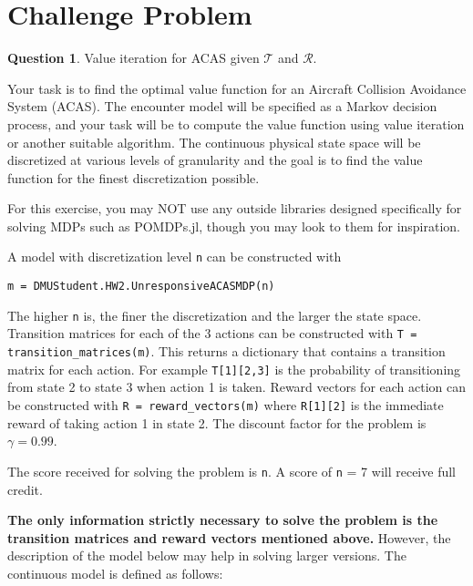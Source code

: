 \documentclass{article}
\theoremstyle{definition}
\newtheorem{question}[thm]{Question}
\begin{document}
\section{Challenge Problem}

\begin{question}
    Value iteration for ACAS given $\mathcal{T}$ and $\mathcal{R}$.

Your task is to find the optimal value function for an Aircraft Collision Avoidance System (ACAS). The encounter model will be specified as a Markov decision process, and your task will be to compute the value function using value iteration or another suitable algorithm. The continuous physical state space will be discretized at various levels of granularity and the goal is to find the value function for the finest discretization possible.

For this exercise, you may NOT use any outside libraries designed specifically for solving MDPs such as POMDPs.jl, though you may look to them for inspiration.

A model with discretization level \texttt{n} can be constructed with
\begin{verbatim}
m = DMUStudent.HW2.UnresponsiveACASMDP(n)
\end{verbatim}
The higher \texttt{n} is, the finer the discretization and the larger the state space. Transition matrices for each of the 3 actions can be constructed with \texttt{T = transition\_matrices(m)}. This returns a dictionary that contains a transition matrix for each action. For example \texttt{T[1][2,3]} is the probability of transitioning from state 2 to state 3 when action 1 is taken. Reward vectors for each action can be constructed with \texttt{R = reward\_vectors(m)} where \texttt{R[1][2]} is the immediate reward of taking action 1 in state 2.
The discount factor for the problem is $\gamma = 0.99$.

The score received for solving the problem is \texttt{n}. A score of \texttt{n} = 7 will receive full credit.

\vspace{1em}
\noindent\makebox[\linewidth]{\rule{\textwidth}{0.4pt}}
\vspace{1em}

\textbf{The only information strictly necessary to solve the problem is the transition matrices and reward vectors mentioned above.} However, the description of the model below may help in solving larger versions. The continuous model is defined as follows:


\end{question}
\end{document}
